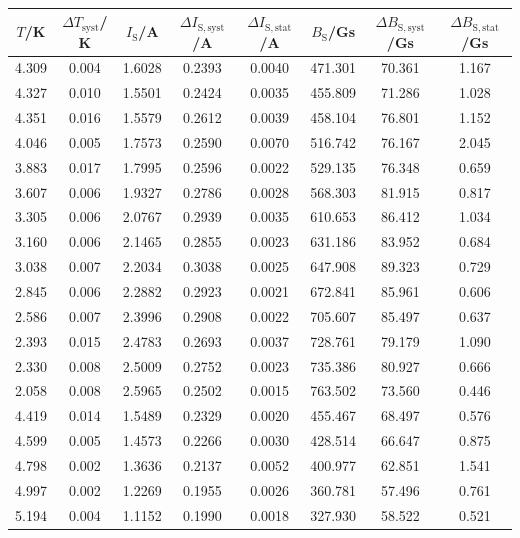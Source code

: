 \documentclass[german,  %
parskip=full,  %
]{scrartcl}
\begin{document}
\\
\begin{table} [h!]\centering 
\begin{tabular}{|c|c|c|c|c|c|c|c|}
\hline
\(T\)/K & \(\Delta T_{\mathrm{syst}}\)/ K & \(I_{\mathrm{S}}\)/A & \(\Delta I_{\mathrm{S,syst}}\)/A  & \(\Delta I_{\mathrm{S,stat}}\)/A  & \(B_{\mathrm{S}}\)/Gs & \(\Delta B_{\mathrm{S,syst}}\)/Gs  & \(\Delta B_{\mathrm{S,stat}}\)/Gs \\\hline
4.309 & 0.004 & 1.6028 & 0.2393 & 0.0040 & 471.301 & 70.361 & 1.167\\\hline
4.327 & 0.010 & 1.5501 & 0.2424 & 0.0035 & 455.809 & 71.286 & 1.028\\\hline
4.351 & 0.016 & 1.5579 & 0.2612 & 0.0039 & 458.104 & 76.801 & 1.152\\\hline
4.046 & 0.005 & 1.7573 & 0.2590 & 0.0070 & 516.742 & 76.167 & 2.045\\\hline
3.883 & 0.017 & 1.7995 & 0.2596 & 0.0022 & 529.135 & 76.348 & 0.659\\\hline
3.607 & 0.006 & 1.9327 & 0.2786 & 0.0028 & 568.303 & 81.915 & 0.817\\\hline
3.305 & 0.006 & 2.0767 & 0.2939 & 0.0035 & 610.653 & 86.412 & 1.034\\\hline
3.160 & 0.006 & 2.1465 & 0.2855 & 0.0023 & 631.186 & 83.952 & 0.684\\\hline
3.038 & 0.007 & 2.2034 & 0.3038 & 0.0025 & 647.908 & 89.323 & 0.729\\\hline
2.845 & 0.006 & 2.2882 & 0.2923 & 0.0021 & 672.841 & 85.961 & 0.606\\\hline
2.586 & 0.007 & 2.3996 & 0.2908 & 0.0022 & 705.607 & 85.497 & 0.637\\\hline
2.393 & 0.015 & 2.4783 & 0.2693 & 0.0037 & 728.761 & 79.179 & 1.090\\\hline
2.330 & 0.008 & 2.5009 & 0.2752 & 0.0023 & 735.386 & 80.927 & 0.666\\\hline
2.058 & 0.008 & 2.5965 & 0.2502 & 0.0015 & 763.502 & 73.560 & 0.446\\\hline
4.419 & 0.014 & 1.5489 & 0.2329 & 0.0020 & 455.467 & 68.497 & 0.576\\\hline
4.599 & 0.005 & 1.4573 & 0.2266 & 0.0030 & 428.514 & 66.647 & 0.875\\\hline
4.798 & 0.002 & 1.3636 & 0.2137 & 0.0052 & 400.977 & 62.851 & 1.541\\\hline
4.997 & 0.002 & 1.2269 & 0.1955 & 0.0026 & 360.781 & 57.496 & 0.761\\\hline
5.194 & 0.004 & 1.1152 & 0.1990 & 0.0018 & 327.930 & 58.522 & 0.521\\\hline

\end{tabular}
\end{table}
\end{document}
